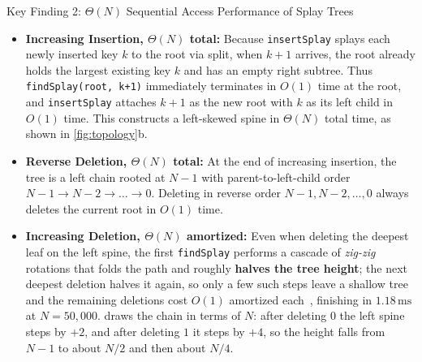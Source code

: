 \documentclass[10pt, a4paper]{article}
\newcommand{\code}[1]{\texttt{\color{primary!90!black}#1}}
\begin{document}
\begin{insightbox}{Key Finding 2: $\Theta(N)$ Sequential Access Performance of Splay Trees}
\begin{itemize}
  \item \textbf{Increasing Insertion, $\Theta(N)$ total:} Because \code{insertSplay} splays each newly inserted key $k$ to the root via split, when $k+1$ arrives, the root already holds the largest existing key $k$ and has an empty right subtree. Thus \code{findSplay(root, k+1)} immediately terminates in $O(1)$ time at the root, and \code{insertSplay} attaches $k+1$ as the new root with $k$ as its left child in $O(1)$ time. This constructs a left-skewed spine in $\Theta(N)$ total time, as shown in \cref{fig:topology}b.
  \item \textbf{Reverse Deletion, $\Theta(N)$ total:} At the end of increasing insertion, the tree is a left chain rooted at $N-1$ with parent-to-left-child order $N-1 \to N-2 \to \dots \to 0$. Deleting in reverse order $N-1, N-2, \dots, 0$ always deletes the current root in $O(1)$ time.
  \item \textbf{Increasing Deletion, $\Theta(N)$ amortized:} Even when deleting the deepest leaf on the left spine, the first \code{findSplay} performs a cascade of \emph{zig-zig} rotations that folds the path and roughly \textbf{halves the tree height}; the next deepest deletion halves it again, so only a few such steps leave a shallow tree and the remaining deletions cost $O(1)$ amortized each~\cite{ads_slides2026}, finishing in $1.18\,\text{ms}$ at $N=50{,}000$.  draws the chain in terms of $N$: after deleting $0$ the left spine steps by $+2$, and after deleting $1$ it steps by $+4$, so the height falls from $N-1$ to about $N/2$ and then about $N/4$.
\end{itemize}
\end{insightbox}
\end{document}
